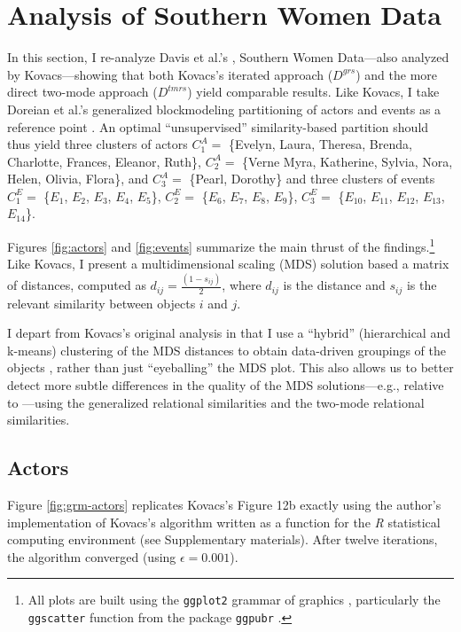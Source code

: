 \documentclass[a4paper,fleqn]{cas-sc}
\begin{document}
\section{Analysis of Southern Women Data}
In this section, I re-analyze Davis et al.'s \citeyearpar{davis1941}, Southern Women Data---also analyzed by Kovacs---showing that both Kovacs's iterated approach ($D^{grs}$) and the more direct two-mode approach ($D^{tmrs}$) yield comparable results. Like Kovacs, I take Doreian et al.'s generalized blockmodeling partitioning of actors and events as a reference point \citeyearpar[Table 4]{doreian2004}. An optimal ``unsupervised'' similarity-based partition should thus yield three clusters of actors $C_1^A =$ \{Evelyn, Laura, Theresa, Brenda, Charlotte, Frances, Eleanor, Ruth\}, $C_2^A=$ \{Verne Myra, Katherine, Sylvia, Nora, Helen, Olivia, Flora\}, and $C_3^A=$ \{Pearl, Dorothy\} and three clusters of events $C_1^E=$ \{$E_1$, $E_2$, $E_3$, $E_4$, $E_5$\}, $C_2^E=$ \{$E_6$, $E_7$, $E_8$, $E_9$\}, $C_3^E=$ \{$E_{10}$, $E_{11}$, $E_{12}$, $E_{13}$, $E_{14}$\}. 

Figures \ref{fig:actors} and \ref{fig:events} summarize the main thrust of the findings.\footnote{All plots are built using the \texttt{ggplot2} grammar of graphics \citep{wickham16}, particularly the \texttt{ggscatter} function from the package \texttt{ggpubr} \citep{kassambara}.} Like Kovacs, I present a multidimensional scaling (MDS) solution based a matrix of distances, computed as $d_{ij} = \frac{(1-s_{ij})}{2}$, where $d_{ij}$ is the distance and $s_{ij}$ is the relevant similarity between objects $i$ and $j$. 

I depart from Kovacs's original analysis in that I use a ``hybrid'' (hierarchical and k-means) clustering of the MDS distances to obtain data-driven groupings of the objects \citep{chen2005novel}, rather than just ``eyeballing'' the MDS plot. This also allows us to better detect more subtle differences in the quality of the MDS solutions---e.g., relative to \citet{doreian2004}---using the generalized relational similarities and the two-mode relational similarities. 

\subsection{Actors}
Figure \ref{fig:grm-actors} replicates Kovacs's \citeyearpar{kovacs2010} Figure 12b exactly using the author's implementation of Kovacs's algorithm written as a function for the \textit{R} statistical computing environment (see Supplementary materials). After twelve iterations, the algorithm converged (using $\epsilon = 0.001$). 
\end{document}
